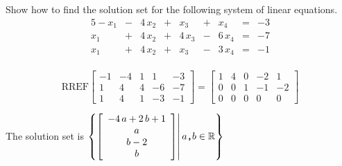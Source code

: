 
\begin{exerciseStatement}


Show how to find the solution set for the following system of linear equations. 
\begin{alignat*}{5} -x_{1} &-& 4 \, x_{2} &+& x_{3} &+& x_{4} &=& -3 \\x_{1} &+& 4 \, x_{2} &+& 4 \, x_{3} &-& 6 \, x_{4} &=& -7 \\x_{1} &+& 4 \, x_{2} &+& x_{3} &-& 3 \, x_{4} &=& -1 \\ \end{alignat*}
            


\end{exerciseStatement}
    
\begin{exerciseAnswer} 
\[\mathrm{RREF} \left[\begin{array}{cccc|c}
-1 & -4 & 1 & 1 & -3 \\
1 & 4 & 4 & -6 & -7 \\
1 & 4 & 1 & -3 & -1
\end{array}\right]  =  \left[\begin{array}{cccc|c}
1 & 4 & 0 & -2 & 1 \\
0 & 0 & 1 & -1 & -2 \\
0 & 0 & 0 & 0 & 0
\end{array}\right] \]

The solution set is \( \left\{ \left[\begin{array}{c}
-4 \, a + 2 \, b + 1 \\
a \\
b - 2 \\
b
\end{array}\right] \middle|\,a\text{\texttt{,}}b\in\mathbb{R}\right\} \)


\end{exerciseAnswer}
    
